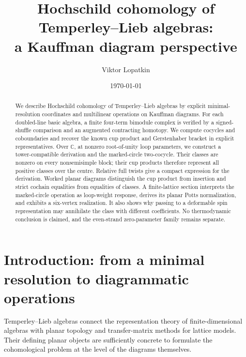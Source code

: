\documentclass[a4paper,11pt,oneside,reqno]{amsart}
\title[Hochschild cohomology and Kauffman diagrams]{Hochschild cohomology of Temperley--Lieb algebras:\\ a Kauffman diagram perspective}
\author{Viktor Lopatkin}
\date{\today}
\theoremstyle{definition}
\numberwithin{equation}{section}
\begin{document}
	
	\begin{abstract}
We describe Hochschild cohomology of Temperley--Lieb algebras by explicit
minimal-resolution coordinates and multilinear operations on Kauffman
diagrams. For each doubled-line basic algebra, a finite four-term
bimodule complex is verified by a signed-shuffle comparison and an
augmented contracting homotopy. We compute cocycles and coboundaries
and recover the known cup product and Gerstenhaber bracket in explicit
representatives. Over $\mathbb C$, at nonzero root-of-unity loop
parameters, we construct a tower-compatible derivation and the
marked-circle two-cocycle. Their classes are nonzero on every
nonsemisimple block; their cup products therefore represent all positive
classes over the centre. Relative full twists give a compact expression
for the derivation. Worked planar diagrams distinguish the cup product
from insertion and strict cochain equalities from equalities of classes.
A finite-lattice section interprets the marked-circle operation as
loop-weight response, derives its planar Potts normalization, and
exhibits a six-vertex realization. It also shows why passing to a
deformable spin representation may annihilate the class with different
coefficients. No thermodynamic conclusion is claimed, and the even-strand
zero-parameter family remains separate.
\end{abstract}
\maketitle

\begingroup
\small
\setlength{\parskip}{0pt}
\tableofcontents
\endgroup


\section{Introduction: from a minimal resolution to diagrammatic operations}
\label{tl:introduction}
Temperley--Lieb algebras connect the representation theory of finite-dimensional
algebras with planar topology and transfer-matrix methods for lattice models.
Their defining planar objects are sufficiently concrete to formulate the
cohomological problem at the level of the diagrams themselves.
\end{document}
